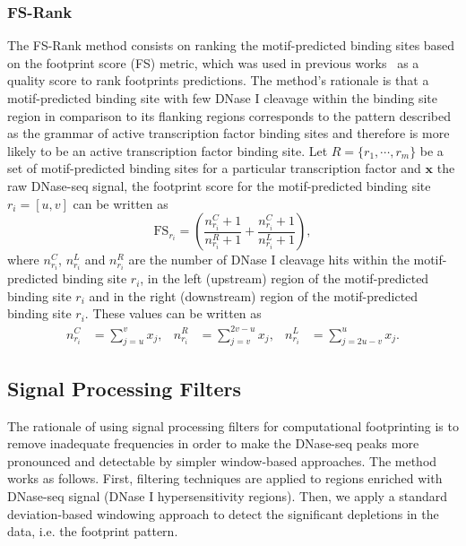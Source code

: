 \subsubsection{FS-Rank}
\label{sec:fs.rank}

The FS-Rank method consists on ranking the motif-predicted binding sites based on the footprint score (FS) metric, which was used in previous works~\cite{neph2012a,he2014} as a quality score to rank footprints predictions. The method's rationale is that a motif-predicted binding site with few DNase I cleavage within the binding site region in comparison to its flanking regions corresponds to the pattern described as the grammar of active transcription factor binding sites and therefore is more likely to be an active transcription factor binding site. Let $R = \{ {r}_{1}, \cdots, {r}_{m} \}$ be a set of motif-predicted binding sites for a particular transcription factor and $\mathbf{x}$ the raw DNase-seq signal, the footprint score for the motif-predicted binding site ${r}_{i} = [u,v]$ can be written as
\begin{equation}
  \label{eq:fs1}
  \text{FS}_{r_i} = \left(\frac{{n}^{C}_{r_i}+1}{{n}^{R}_{r_i}+1} + \frac{{n}^{C}_{r_i}+1}{{n}^{L}_{r_i}+1}\right),
\end{equation}
where ${n}^{C}_{r_i}$, ${n}^{L}_{r_i}$ and ${n}^{R}_{r_i}$ are the number of DNase I cleavage hits within the motif-predicted binding site $r_i$, in the left (upstream) region of the motif-predicted binding site $r_i$ and in the right (downstream) region of the motif-predicted binding site $r_i$. These values can be written as
\begin{align}
  \label{eq:fs2}
  {n}^{C}_{r_i} &= \sum_{j=u}^{v} {x}_{j}, &
  {n}^{R}_{r_i} &= \sum_{j=v}^{2v-u} {x}_{j}, &
  {n}^{L}_{r_i} &= \sum_{j=2u-v}^{u} {x}_{j}.
\end{align}

\subsection{Signal Processing Filters}
\label{sec:signal.processing.filters}

The rationale of using signal processing filters for computational footprinting is to remove inadequate frequencies in order to make the DNase-seq peaks more pronounced and detectable by simpler window-based approaches. The method works as follows. First, filtering techniques are applied to regions enriched with DNase-seq signal (DNase I hypersensitivity regions). Then, we apply a standard deviation-based windowing approach to detect the significant depletions in the data, i.e. the footprint pattern.


